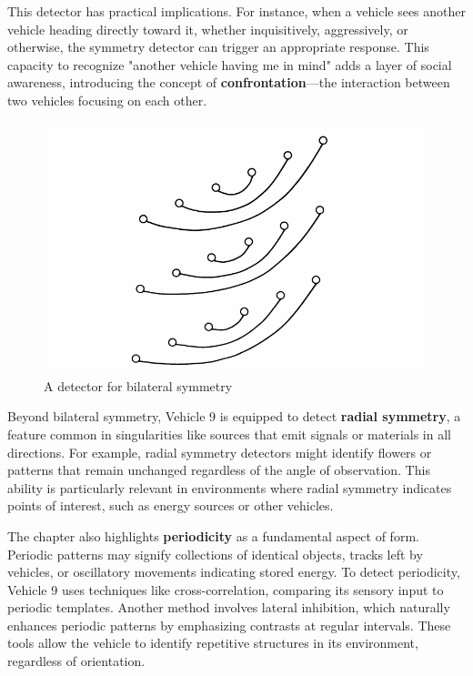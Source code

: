 \documentclass{article}
\begin{document}
	This detector has practical implications. For instance, when a vehicle sees another vehicle heading directly toward it, whether inquisitively, aggressively, or otherwise, the symmetry detector can trigger an appropriate response. This capacity to recognize "another vehicle having me in mind" adds a layer of social awareness, introducing the concept of \textbf{confrontation}—the interaction between two vehicles focusing on each other.

	\begin{figure}[h]
		\centering
		\includegraphics[scale=0.5]{images/figure_16.png}
		\caption{A detector for bilateral symmetry}
		\label{fig:vehicle-16}
	\end{figure}

	Beyond bilateral symmetry, Vehicle 9 is equipped to detect \textbf{radial symmetry}, a feature common in singularities like sources that emit signals or materials in all directions. For example, radial symmetry detectors might identify flowers or patterns that remain unchanged regardless of the angle of observation. This ability is particularly relevant in environments where radial symmetry indicates points of interest, such as energy sources or other vehicles.  

	The chapter also highlights \textbf{periodicity} as a fundamental aspect of form. Periodic patterns may signify collections of identical objects, tracks left by vehicles, or oscillatory movements indicating stored energy. To detect periodicity, Vehicle 9 uses techniques like cross-correlation, comparing its sensory input to periodic templates. Another method involves lateral inhibition, which naturally enhances periodic patterns by emphasizing contrasts at regular intervals. These tools allow the vehicle to identify repetitive structures in its environment, regardless of orientation.
	
\end{document}
